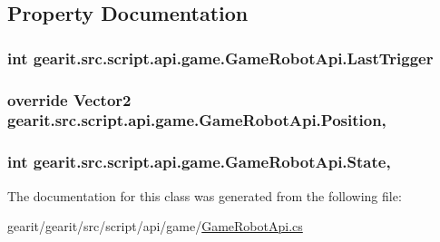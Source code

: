 \subsection{Property Documentation}
\hypertarget{classgearit_1_1src_1_1script_1_1api_1_1game_1_1_game_robot_api_a556a9a3f8365f56f651d8a5b44b9e2a3}{
\subsubsection[{Last\+Trigger}]{\setlength{\rightskip}{0pt plus 5cm}int gearit.\+src.\+script.\+api.\+game.\+Game\+Robot\+Api.\+Last\+Trigger\hspace{0.3cm}{\ttfamily [get]}}}\label{classgearit_1_1src_1_1script_1_1api_1_1game_1_1_game_robot_api_a556a9a3f8365f56f651d8a5b44b9e2a3}
\hypertarget{classgearit_1_1src_1_1script_1_1api_1_1game_1_1_game_robot_api_abd4d5479e6043717ab3ef16e235d446b}{
\subsubsection[{Position}]{\setlength{\rightskip}{0pt plus 5cm}override Vector2 gearit.\+src.\+script.\+api.\+game.\+Game\+Robot\+Api.\+Position\hspace{0.3cm}{\ttfamily [get]}, {\ttfamily [set]}}}\label{classgearit_1_1src_1_1script_1_1api_1_1game_1_1_game_robot_api_abd4d5479e6043717ab3ef16e235d446b}
\hypertarget{classgearit_1_1src_1_1script_1_1api_1_1game_1_1_game_robot_api_ac59a34e107daf418a032c2c119216529}{
\subsubsection[{State}]{\setlength{\rightskip}{0pt plus 5cm}int gearit.\+src.\+script.\+api.\+game.\+Game\+Robot\+Api.\+State\hspace{0.3cm}{\ttfamily [get]}, {\ttfamily [set]}}}\label{classgearit_1_1src_1_1script_1_1api_1_1game_1_1_game_robot_api_ac59a34e107daf418a032c2c119216529}


The documentation for this class was generated from the following file\+:\begin{DoxyCompactItemize}
\item 
gearit/gearit/src/script/api/game/\hyperlink{_game_robot_api_8cs}{Game\+Robot\+Api.\+cs}\end{DoxyCompactItemize}
